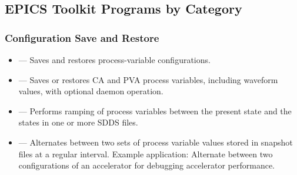 \documentclass[11pt]{article}
\begin{document}
\subsection{EPICS Toolkit Programs by Category}
\subsubsection{Configuration Save and Restore}
\begin{itemize}
  \item {} --- Saves and restores process-variable configurations.
  \item {} --- Saves or restores CA and PVA process
        variables, including waveform values, with optional daemon operation.
  \item {} --- Performs ramping of process variables between
the present state and the states in one or more SDDS files.
  \item {} --- Alternates between two sets of process variable values stored in snapshot files
        at a regular interval.
        Example application: Alternate between two configurations of an accelerator for debugging
        accelerator performance.
\end{itemize}
\end{document}
